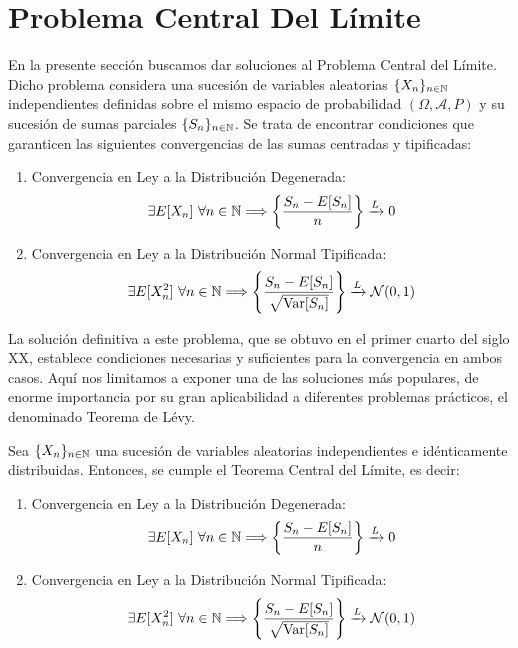 \section{Problema Central Del Límite}

En la presente sección buscamos dar soluciones al Problema Central del Límite. Dicho problema considera una sucesión de variables aleatorias $\{X_n\}_{n\in \mathbb{N}}$ independientes definidas sobre el mismo espacio de probabilidad $(\Omega, \mathcal{A}, P)$ y su sucesión de sumas parciales $\{S_n\}_{n\in \mathbb{N}}$. Se trata de encontrar condiciones que garanticen las siguientes convergencias de las sumas centradas y tipificadas:
\begin{enumerate}
    \item Convergencia en Ley a la Distribución Degenerada:
    \begin{equation*}
        \exists E[X_n]~\forall n\in \mathbb{N}\Longrightarrow \left\{\frac{S_n - E[S_n]}{n}\right\} \xrightarrow{L} 0
    \end{equation*}
    \item Convergencia en Ley a la Distribución Normal Tipificada:
    \begin{equation*}
        \exists E[X_n^2]~\forall n\in \mathbb{N}\Longrightarrow \left\{\frac{S_n - E[S_n]}{\sqrt{\operatorname{Var}[S_n]}}\right\} \xrightarrow{L} \mathcal{N}(0,1)
    \end{equation*}
\end{enumerate}

La solución definitiva a este problema, que se obtuvo en el primer cuarto del siglo XX, establece condiciones necesarias y suficientes para la convergencia en ambos casos. Aquí nos limitamos a exponer una de las soluciones más populares, de enorme importancia por su gran aplicabilidad a diferentes problemas prácticos, el denominado Teorema de Lévy.
\begin{teo}
    Sea $\{X_n\}_{n\in \mathbb{N}}$ una sucesión de variables aleatorias independientes e idénticamente distribuidas. Entonces, se cumple el Teorema Central del Límite, es decir:
    \begin{enumerate}
        \item Convergencia en Ley a la Distribución Degenerada:
        \begin{equation*}
            \exists E[X_n]~\forall n\in \mathbb{N}\Longrightarrow \left\{\frac{S_n - E[S_n]}{n}\right\} \xrightarrow{L} 0
        \end{equation*}
        \item Convergencia en Ley a la Distribución Normal Tipificada:
        \begin{equation*}
            \exists E[X_n^2]~\forall n\in \mathbb{N}\Longrightarrow \left\{\frac{S_n - E[S_n]}{\sqrt{\operatorname{Var}[S_n]}}\right\} \xrightarrow{L} \mathcal{N}(0,1)
        \end{equation*}
    \end{enumerate}
\end{teo}

